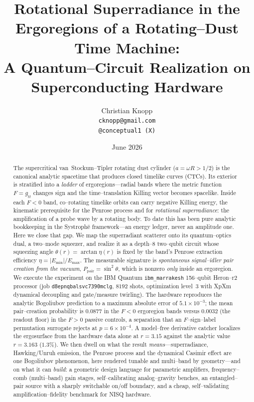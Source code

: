 \documentclass[11pt]{article}
\title{\textbf{Rotational Superradiance in the Ergoregions of a Rotating--Dust
Time Machine:\\ A Quantum--Circuit Realization on Superconducting Hardware}}
\author{Christian Knopp\\\texttt{cknopp@gmail.com}\\\texttt{@conceptual1 (X)}}
\date{June 2026}
\newcommand{\Ppair}{P_{\mathrm{pair}}}
\newcommand{\Emin}{E_{\min}}
\newcommand{\Emax}{E_{\max}}
\newcommand{\code}[1]{\texttt{\small #1}}
\begin{document}
\maketitle

\begin{abstract}
The supercritical van~Stockum--Tipler rotating dust cylinder ($a=\omega R>1/2$) is the
canonical analytic spacetime that produces closed timelike curves (CTCs). Its exterior is
stratified into a \emph{ladder} of ergoregions---radial bands where the metric function
$F=g_{tt}$ changes sign and the time--translation Killing vector becomes spacelike. Inside each
$F<0$ band, co--rotating timelike orbits can carry negative Killing energy, the kinematic
prerequisite for the Penrose process and for \emph{rotational superradiance}: the amplification
of a probe wave by a rotating body. To date this has been pure analytic bookkeeping in the
Systroph\=e framework---an energy ledger, never an amplitude one. Here we close that gap. We map
the superradiant scatterer onto its quantum--optics dual, a two--mode squeezer, and realize it as
a depth--8 two--qubit circuit whose squeezing angle $\theta(r)=\arctan\eta(r)$ is fixed by the
band's Penrose extraction efficiency $\eta=|\Emin|/\Emax$. The measurable signature is
\emph{spontaneous signal--idler pair creation from the vacuum}, $\Ppair=\sin^2\theta$, which is
nonzero \emph{only} inside an ergoregion. We execute the experiment on the IBM Quantum
\code{ibm\_marrakesh} 156--qubit Heron--r2 processor (job \code{d8epnqbalsvc7390mclg}, $8192$
shots, optimization level~3 with XpXm dynamical decoupling and gate/measure twirling). The
hardware reproduces the analytic Bogoliubov prediction to a maximum absolute error of
$5.1\times10^{-3}$; the mean pair--creation probability is $0.0877$ in the $F<0$ ergoregion bands
versus $0.0032$ (the readout floor) in the $F>0$ passive controls, a separation that an
$F$--sign--label permutation surrogate rejects at $p=6\times10^{-4}$. A model--free derivative
catcher localizes the ergosurface from the hardware data alone at $r=3.15$ against the analytic
value $r=3.163$ ($1.3\%$). We then dwell on what the result \emph{means}---superradiance,
Hawking/Unruh emission, the Penrose process and the dynamical Casimir effect are one Bogoliubov
phenomenon, here rendered tunable and multi--band by geometry---and on what it can \emph{build}:
a geometric design language for parametric amplifiers, frequency--comb (multi--band) gain stages,
self--calibrating analog--gravity benches, an entangled--pair source with a sharply switchable
on/off boundary, and a cheap, self--validating amplification--fidelity benchmark for NISQ
hardware.
\end{abstract}
\end{document}
